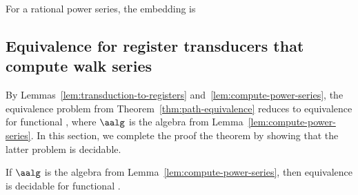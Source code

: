 For a rational power series, the embedding is 

\subsection{Equivalence for register transducers that compute walk series}\label{sec:decide-power-series}
By Lemmas~\ref{lem:transduction-to-registers} and~\ref{lem:compute-power-series}, the  equivalence problem from Theorem~\ref{thm:path-equivalence} reduces to equivalence for functional \regTsover{\aalg}, where $\aalg$ is the algebra from Lemma~\ref{lem:compute-power-series}. In this section, we complete the proof the theorem by showing that the latter problem is decidable.
\begin{lemma}\label{lem:functionality-decidable-power-series} If $\aalg$ is the algebra from Lemma~\ref{lem:compute-power-series}, then equivalence is decidable for functional \regTsover{\aalg}. 
\end{lemma}
